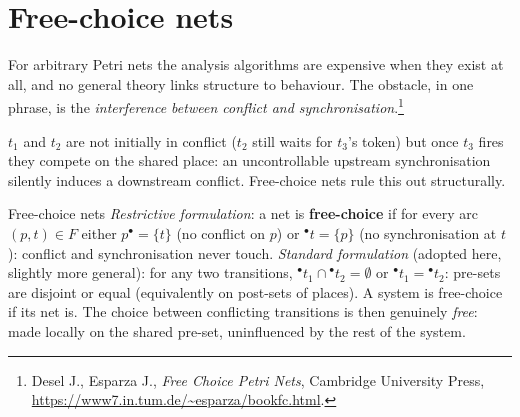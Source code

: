 \section{Free-choice nets}

For arbitrary Petri nets the analysis algorithms are expensive when they exist at all, and no general theory links structure to behaviour. The obstacle, in one phrase, is the \emph{interference between conflict and synchronisation}.\footnote{Desel J., Esparza J., \emph{Free Choice Petri Nets}, Cambridge University Press, \url{https://www7.in.tum.de/~esparza/bookfc.html}.}
\begin{center}
\end{center}
$t_1$ and $t_2$ are not initially in conflict ($t_2$ still waits for $t_3$'s token) but once $t_3$ fires they compete on the shared place: an uncontrollable upstream synchronisation silently induces a downstream conflict. Free-choice nets rule this out structurally.

\begin{definitionbox}{Free-choice nets}
\emph{Restrictive formulation}: a net is \textbf{free-choice} if for every arc $(p, t) \in F$ either $p^\bullet = \{t\}$ (no conflict on $p$) or ${}^\bullet t = \{p\}$ (no synchronisation at $t$): conflict and synchronisation never touch.
\emph{Standard formulation} (adopted here, slightly more general): for any two transitions, ${}^\bullet t_1 \cap {}^\bullet t_2 = \emptyset$ or ${}^\bullet t_1 = {}^\bullet t_2$: pre-sets are disjoint or equal (equivalently on post-sets of places). A system is free-choice if its net is. The choice between conflicting transitions is then genuinely \emph{free}: made locally on the shared pre-set, uninfluenced by the rest of the system.
\end{definitionbox}

